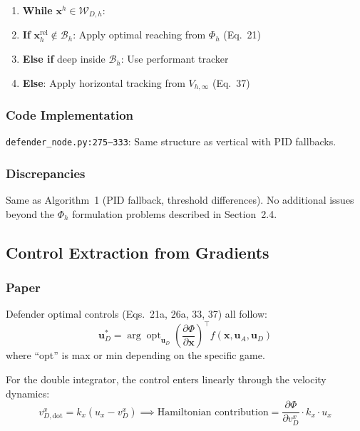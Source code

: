 \documentclass[11pt,a4paper]{article}
\begin{document}
\begin{enumerate}[nosep]
\item \textbf{While} $\mathbf{x}^h \in \mathcal{W}_{D,h}$:
\item \quad \textbf{If} $\mathbf{x}^{\mathrm{rel}}_h \notin \mathcal{B}_h$: Apply optimal reaching from $\Phi_h$ (Eq.~21)
\item \quad \textbf{Else if} deep inside $\mathcal{B}_h$: Use performant tracker
\item \quad \textbf{Else}: Apply horizontal tracking from $V_{h,\infty}$ (Eq.~37)
\end{enumerate}

\subsubsection{Code Implementation}

\texttt{defender\_node.py:275--333}: Same structure as vertical with PID fallbacks.

\subsubsection{Discrepancies}

Same as Algorithm~1 (PID fallback, threshold differences). No additional issues beyond the $\Phi_h$ formulation problems described in Section~2.4.

\subsection{Control Extraction from Gradients}

\subsubsection{Paper}

Defender optimal controls (Eqs.~21a, 26a, 33, 37) all follow:
\begin{equation}
\mathbf{u}^*_D = \arg\!\operatorname{opt}_{\mathbf{u}_D} \left(\frac{\partial \Phi}{\partial \mathbf{x}}\right)^{\!\top} f(\mathbf{x}, \mathbf{u}_A, \mathbf{u}_D)
\end{equation}
where ``opt'' is max or min depending on the specific game.

For the double integrator, the control enters linearly through the velocity dynamics:
\begin{equation}
v^x_{D,\mathrm{dot}} = k_x(u_x - v^x_D) \implies \text{Hamiltonian contribution} = \frac{\partial\Phi}{\partial v^x_D} \cdot k_x \cdot u_x
\end{equation}
\end{document}
